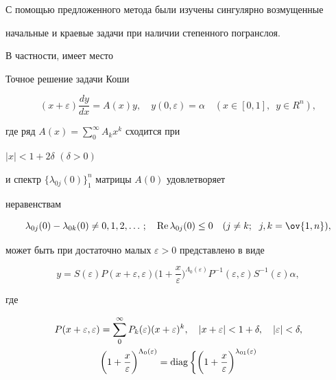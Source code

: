 С помощью предложенного метода были изучены сингулярно возмущенные 


начальные и краевые задачи при наличии степенного погранслоя. 


В частности, имеет место 


 


\begin{thm} 


Точное решение задачи Коши 


$$ 


(x+\varepsilon)\frac{d y}{d x}=A(x)y,\quad 


y(0,\varepsilon)=\alpha\quad (x\in[0,1],\ \; y\in R^n), 


$$ 


где ряд $A(x)=\sum\limits^\infty_0 A_k x^k$ сходится при 


$|x|<1+2\delta$ $(\delta>0)$


и спектр $\{\lambda_{0j}(0)\}^n_1$ матрицы $A(0)$ удовлетворяет 


неравенствам 


$$ 


\lambda_{0j}(0)-\lambda_{0k}(0)\ne0,1,2,\dotsc;\quad 


\re\lambda_{0j}(0)\le0\quad(j\ne k;\ \; j,k=\ov{1,n}), 


$$ 


может быть при достаточно малых $\varepsilon>0$ представлено в виде 


$$ 


y=S(\varepsilon)P(x+\varepsilon,\varepsilon) 


\bigg(1+\frac{x}{\varepsilon} \bigg)^{\Lambda_0(\varepsilon)} 


P^{-1}(\varepsilon,\varepsilon)S^{-1}(\varepsilon)\alpha, 


$$ 


где 


\begin{gather*} 


P(x+\varepsilon,\varepsilon)=\sum^\infty_0 


P_k(\varepsilon)(x+\varepsilon)^k,\quad 


|x+\varepsilon|<1+\delta,\quad |\varepsilon|<\delta,\\ 


%


\bigg(1+\frac{x}{\varepsilon} \bigg)^{\Lambda_0(\varepsilon)}= 


\diag\bigg\{\bigg(1+\frac{x}{\varepsilon}\bigg)^{\lambda_{01}(\varepsilon)} 



\end{gather*}
\end{thm}
